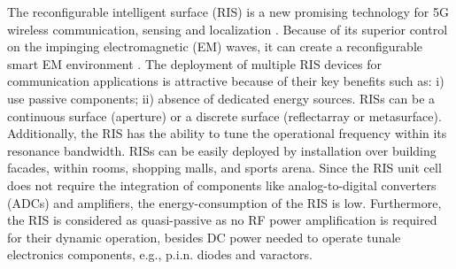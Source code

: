 \documentclass[summary]{ursi}
\begin{document}
The reconfigurable intelligent surface (RIS) is a new promising technology for 5G wireless communication, sensing and localization \cite{strinati2021wireless}\cite{basar2019wireless}\cite{wymeersch2020radio}\cite{alexandropoulos2021reconfigurable}. Because of its superior control on the impinging electromagnetic (EM) waves, it can create a reconfigurable smart EM environment \cite{di2020smart}. The deployment of multiple RIS devices for communication applications is attractive because of their key benefits such as: i) use passive components; ii) absence of dedicated energy sources. RISs can be a continuous surface (aperture) or a discrete surface (reflectarray or metasurface). Additionally, the RIS has the ability to tune the operational frequency within its resonance bandwidth. RISs can be easily deployed by installation over building facades, within rooms, shopping malls, and sports arena. Since the RIS unit cell does not require the integration of components like analog-to-digital converters (ADCs) and amplifiers, the energy-consumption of the RIS is low. Furthermore, the RIS is considered as quasi-passive as no RF power amplification is required for their dynamic operation, besides DC power needed to operate tunale electronics components, e.g., p.i.n. diodes and varactors. 
\end{document}
